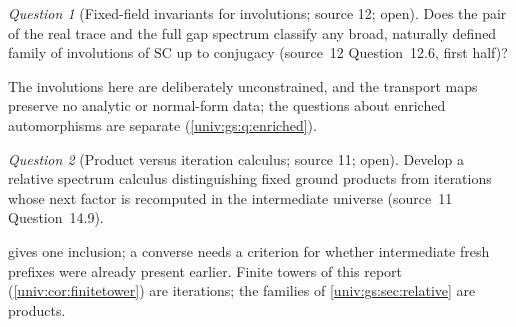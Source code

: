 \documentclass[11pt,letterpaper]{article}
\numberwithin{equation}{section}
\theoremstyle{definition}
\theoremstyle{remark}
\newtheorem{question}[question]{Question}
\newcommand{\SC}{\mathrm{SC}}
\begin{document}
\begin{question}[Fixed-field invariants for involutions; source 12; open]\label{univ:gs:q:involutions}
Does the pair of the real trace and the full gap spectrum classify any broad, naturally defined
family of involutions of $\SC$ up to conjugacy (source~12 Question~12.6, first half)?
\end{question}
The involutions here are deliberately unconstrained, and the transport maps preserve no analytic
or normal-form data; the questions about enriched automorphisms are separate
(\cref{univ:gs:q:enriched}).

\begin{question}[Product versus iteration calculus; source 11; open]\label{univ:gs:q:iteration}
Develop a relative spectrum calculus distinguishing fixed ground products from iterations whose
next factor is recomputed in the intermediate universe (source~11 Question~14.9).
\end{question}
 gives one inclusion; a converse needs a criterion for whether intermediate
fresh prefixes were already present earlier. Finite towers of this report
(\cref{univ:cor:finitetower}) are iterations; the families of \cref{univ:gs:sec:relative} are
products.
\end{document}
